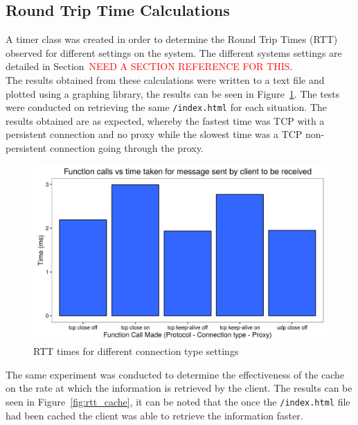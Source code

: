 \documentclass[10pt,twocolumn]{witseiepaper}
\begin{document}
	\subsection{Round Trip Time Calculations}
	
		A timer class was created in order to determine the Round Trip Times (RTT) observed for different settings on the system. The different systems settings are detailed in Section~\textcolor{red}{NEED A SECTION REFERENCE FOR THIS}. \\
		
		The results obtained from these calculations were written to a text file and plotted using a graphing library, the results can be seen in Figure~\ref{fig:rtt}. The tests were conducted on retrieving the same \texttt{/index.html} for each situation. The results obtained are as expected, whereby the fastest time was TCP with a persistent connection and no proxy while the slowest time was a TCP non-persistent connection going through the proxy. 
		
		\begin{figure}
			\centering
			\includegraphics[width=\columnwidth]{resources/RTT.png}
			\caption{RTT times for different connection type settings}
			\label{fig:rtt}
		\end{figure}
		
		The same experiment was conducted to determine the effectiveness of the cache on the rate at which the information is retrieved by the client. The results can be seen in Figure~\ref{fig:rtt_cache}, it can be noted that the once the \texttt{/index.html} file had been cached the client was able to retrieve the information faster.
		
\end{document}
